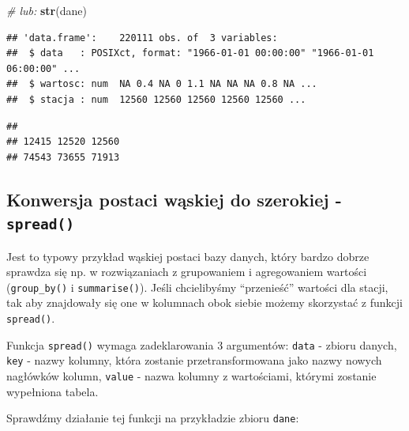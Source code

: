 \documentclass[]{book}
\newenvironment{Shaded}{\begin{snugshade}}{\end{snugshade}}
\newcommand{\KeywordTok}[1]{\textcolor[rgb]{0.13,0.29,0.53}{\textbf{#1}}}
\newcommand{\CommentTok}[1]{\textcolor[rgb]{0.56,0.35,0.01}{\textit{#1}}}
\newcommand{\OperatorTok}[1]{\textcolor[rgb]{0.81,0.36,0.00}{\textbf{#1}}}
\newcommand{\NormalTok}[1]{#1}
\theoremstyle{definition}
\theoremstyle{definition}
\theoremstyle{definition}
\theoremstyle{remark}
\begin{document}
\begin{Shaded}
\begin{Highlighting}[]
\CommentTok{# lub:}
\KeywordTok{str}\NormalTok{(dane)}
\end{Highlighting}
\end{Shaded}

\begin{verbatim}
## 'data.frame':    220111 obs. of  3 variables:
##  $ data   : POSIXct, format: "1966-01-01 00:00:00" "1966-01-01 06:00:00" ...
##  $ wartosc: num  NA 0.4 NA 0 1.1 NA NA NA 0.8 NA ...
##  $ stacja : num  12560 12560 12560 12560 12560 ...
\end{verbatim}

\begin{Shaded}
\end{Shaded}

\begin{verbatim}
## 
## 12415 12520 12560 
## 74543 73655 71913
\end{verbatim}

\subsection*{\texorpdfstring{Konwersja postaci wąskiej do szerokiej -
\texttt{spread()}}{Konwersja postaci wąskiej do szerokiej - spread()}}\label{konwersja-postaci-waskiej-do-szerokiej---spread}

Jest to typowy przykład wąskiej postaci bazy danych, który bardzo dobrze
sprawdza się np. w rozwiązaniach z grupowaniem i agregowaniem wartości
(\texttt{group\_by()} i \texttt{summarise()}). Jeśli chcielibyśmy
``przenieść'' wartości dla stacji, tak aby znajdowały się one w
kolumnach obok siebie możemy skorzystać z funkcji \texttt{spread()}.

Funkcja \texttt{spread()} wymaga zadeklarowania 3 argumentów:
\texttt{data} - zbioru danych, \texttt{key} - nazwy kolumny, która
zostanie przetransformowana jako nazwy nowych nagłówków kolumn,
\texttt{value} - nazwa kolumny z wartościami, którymi zostanie
wypełniona tabela.

Sprawdźmy działanie tej funkcji na przykładzie zbioru \texttt{dane}:
\end{document}
